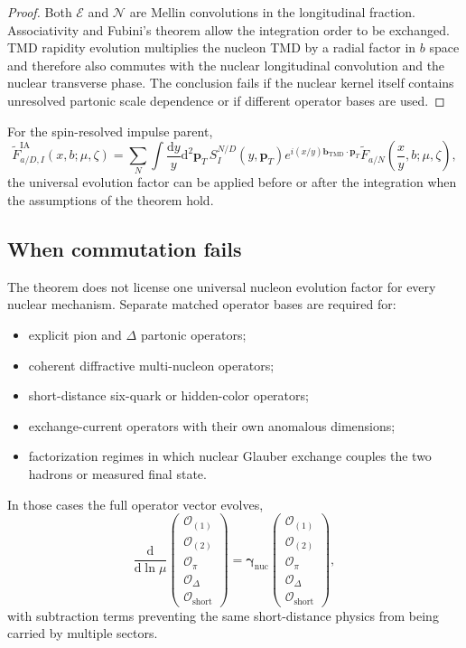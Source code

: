 \documentclass[11pt]{article}
\newcommand{\bM}{\bm{b}_{\mathrm{TMD}}}
\newcommand{\dd}{\mathrm{d}}
\newcommand{\cO}{\mathcal O}
\newcommand{\cE}{\mathcal E}
\newcommand{\cN}{\mathcal N}
\newcommand{\IA}{\mathrm{IA}}
\newcommand{\pT}{\bm{p}_{T}}
\newcommand{\shortd}{\mathrm{short}}
\newcommand{\nuc}{\mathrm{nuc}}
\begin{document}
\begin{proof}
Both \(\cE\) and \(\cN\) are Mellin convolutions in the longitudinal
fraction.  Associativity and Fubini's theorem allow the integration order to
be exchanged.  TMD rapidity evolution multiplies the nucleon TMD by a radial
factor in \(b\) space and therefore also commutes with the nuclear
longitudinal convolution and the nuclear transverse phase.  The conclusion
fails if the nuclear kernel itself contains unresolved partonic scale
dependence or if different operator bases are used.
\end{proof}

For the spin-resolved impulse parent,
\begin{equation}
 \widetilde F_{a/D,I}^{\IA}(x,b;\mu,\zeta)
 =
 \sum_N\int\frac{\dd y}{y}\dd^2\pT\,
 S_{I}^{N/D}(y,\pT)
 e^{i(x/y)\bM\cdot\pT}
 \widetilde F_{a/N}
 \left(\frac{x}{y},b;\mu,\zeta\right),
 \label{eq:evolved-impulse-convolution}
\end{equation}
the universal evolution factor can be applied before or after the integration
when the assumptions of the theorem hold.

\subsection{When commutation fails}

The theorem does not license one universal nucleon evolution factor for every
nuclear mechanism.  Separate matched operator bases are required for:
\begin{itemize}
\item explicit pion and \(\Delta\) partonic operators;
\item coherent diffractive multi-nucleon operators;
\item short-distance six-quark or hidden-color operators;
\item exchange-current operators with their own anomalous dimensions;
\item factorization regimes in which nuclear Glauber exchange couples the two
      hadrons or measured final state.
\end{itemize}
In those cases the full operator vector evolves,
\begin{equation}
 \frac{\dd}{\dd\ln\mu}
 \begin{pmatrix}
 \cO_{(1)}\\\cO_{(2)}\\\cO_{\pi}\\\cO_{\Delta}\\\cO_{\shortd}
 \end{pmatrix}
 =\bm\gamma_{\nuc}
 \begin{pmatrix}
 \cO_{(1)}\\\cO_{(2)}\\\cO_{\pi}\\\cO_{\Delta}\\\cO_{\shortd}
 \end{pmatrix},
 \label{eq:nuclear-operator-mixing}
\end{equation}
with subtraction terms preventing the same short-distance physics from being
carried by multiple sectors.
\end{document}
